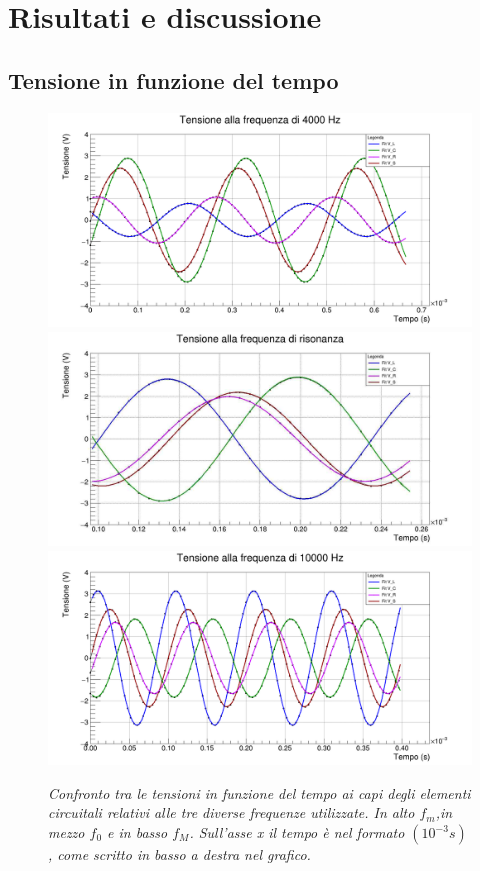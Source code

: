 \documentclass{article}
\begin{document}
\section{Risultati e discussione}
\subsection{Tensione in funzione del tempo}
\begin{figure}[]
  \centering
  \includegraphics[scale=0.27]{FitFMin.png}
  \qquad
  \includegraphics[scale=0.27]{FitF0.jpg}
  \qquad
  \includegraphics[scale=0.27]{FitFMag.png}
  \caption{\textit{Confronto tra le tensioni in funzione del tempo ai capi degli elementi circuitali relativi alle tre diverse frequenze utilizzate. In alto $f_m$,in mezzo $f_0$ e in basso $f_M$. Sull'asse x il tempo è nel formato $(10^{-3}s)$, come scritto in basso a destra nel grafico. }}
\end{figure}
\end{document}
